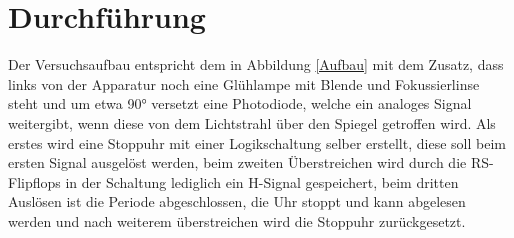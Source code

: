     
  \section{Durchführung}
    
    Der Versuchsaufbau entspricht dem in Abbildung \ref{Aufbau} mit dem Zusatz, dass links von der Apparatur 
    noch eine Glühlampe mit Blende und Fokussierlinse steht und um etwa 90° versetzt eine 
   Photodiode, welche ein analoges Signal weitergibt, wenn diese von dem Lichtstrahl über den Spiegel 
    getroffen wird.
   Als erstes wird eine Stoppuhr mit einer Logikschaltung selber erstellt, diese soll beim ersten Signal ausgelöst werden, 
   beim zweiten Überstreichen wird durch die RS-Flipflops in der Schaltung lediglich ein H-Signal gespeichert, 
   beim dritten Auslösen ist die Periode abgeschlossen, die Uhr stoppt und kann abgelesen werden 
   und nach weiterem überstreichen wird die Stoppuhr zurückgesetzt.
   
